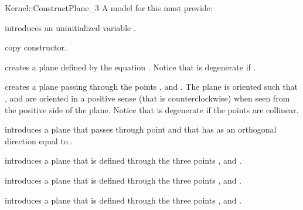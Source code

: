 \begin{ccRefFunctionObjectConcept}{Kernel::ConstructPlane_3}
A model for this must provide:


\ccHidden {}
             {introduces an uninitialized variable .}

\ccHidden {}
 	    {copy constructor.}

{creates a plane  defined by the equation
 .
Notice that  is degenerate if .}

{creates a plane  passing through the points ,
  and . The plane is oriented such that , 
  and  are oriented in a positive sense 
 (that is counterclockwise) when seen from the positive side of the plane.
Notice that  is degenerate if the points are collinear.}


{introduces a plane  that passes through point  and
 that has as an orthogonal direction equal to .}

{introduces a plane  that is defined through the  three points 
 ,  and .}

{introduces a plane  that is defined through the  three points 
 ,  and .}

{introduces a plane  that is defined through the  three points 
 ,  and .}

\ccSeeAlso
{} \\

\end{ccRefFunctionObjectConcept}
